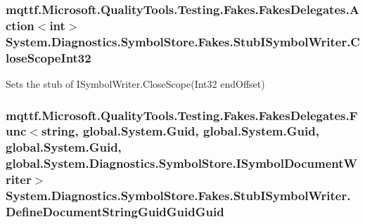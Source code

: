 \hypertarget{class_system_1_1_diagnostics_1_1_symbol_store_1_1_fakes_1_1_stub_i_symbol_writer_af1d7a69b80392211effad3a6342a8199}{
\subsubsection[{Close\-Scope\-Int32}]{\setlength{\rightskip}{0pt plus 5cm}mqttf.\-Microsoft.\-Quality\-Tools.\-Testing.\-Fakes.\-Fakes\-Delegates.\-Action$<$int$>$ System.\-Diagnostics.\-Symbol\-Store.\-Fakes.\-Stub\-I\-Symbol\-Writer.\-Close\-Scope\-Int32}}\label{class_system_1_1_diagnostics_1_1_symbol_store_1_1_fakes_1_1_stub_i_symbol_writer_af1d7a69b80392211effad3a6342a8199}


Sets the stub of I\-Symbol\-Writer.\-Close\-Scope(\-Int32 end\-Offset)

\hypertarget{class_system_1_1_diagnostics_1_1_symbol_store_1_1_fakes_1_1_stub_i_symbol_writer_ab57ed8246d4f1ebb7cafded8f0cc5d53}{
\subsubsection[{Define\-Document\-String\-Guid\-Guid\-Guid}]{\setlength{\rightskip}{0pt plus 5cm}mqttf.\-Microsoft.\-Quality\-Tools.\-Testing.\-Fakes.\-Fakes\-Delegates.\-Func$<$string, global.\-System.\-Guid, global.\-System.\-Guid, global.\-System.\-Guid, global.\-System.\-Diagnostics.\-Symbol\-Store.\-I\-Symbol\-Document\-Writer$>$ System.\-Diagnostics.\-Symbol\-Store.\-Fakes.\-Stub\-I\-Symbol\-Writer.\-Define\-Document\-String\-Guid\-Guid\-Guid}}\label{class_system_1_1_diagnostics_1_1_symbol_store_1_1_fakes_1_1_stub_i_symbol_writer_ab57ed8246d4f1ebb7cafded8f0cc5d53}


